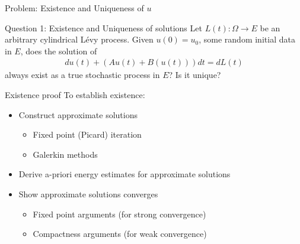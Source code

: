 \documentclass[xcolor=dvipsnames,leqno]{beamer}
\begin{document}
\begin{frame}{Problem: Existence and Uniqueness of $u$}
\vspace{0.3cm}	
\begin{block}{Question 1: Existence and Uniqueness of solutions }
Let $L(t) : \Omega\to E$ be an arbitrary cylindrical L\'evy process. Given $u(0)=u_0$, some random initial data in $E$, does the solution of 
\begin{align*}
	du(t)+(Au(t)+B(u(t)))dt=dL(t)
\end{align*}
always exist as a true stochastic process in $E$? Is it unique?
\end{block}		
\end{frame}
\begin{frame}{Existence proof}
To establish existence:
	\begin{itemize}
		 \setlength{\itemsep}{20pt}
		\item Construct approximate solutions
		\begin{itemize}
			\setlength{\itemsep}{10pt}
			\item Fixed point (Picard) iteration
			\item Galerkin methods
		\end{itemize}
		   
		\item Derive a-priori energy estimates for approximate solutions
		       
		\item Show approximate solutions converges
		\begin{itemize}
			 \setlength{\itemsep}{10pt}
			\item Fixed point arguments (for strong convergence)
			\item Compactness arguments  (for weak convergence)
		\end{itemize}
	\end{itemize}
\end{frame}
\end{document}
